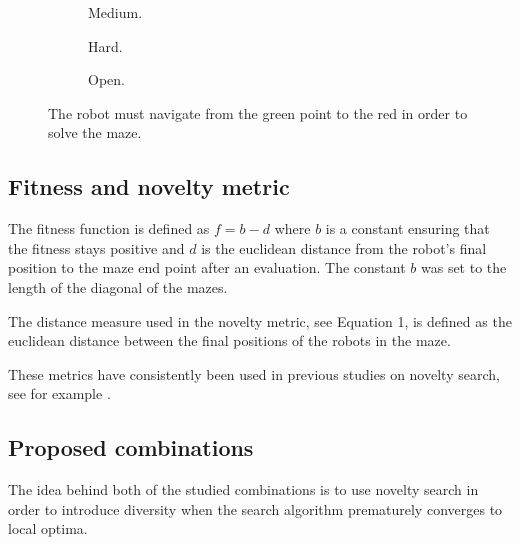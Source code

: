 \begin{figure}[H]
    \captionsetup[subfigure]{justification=centering}
    \centering
    \begin{mdframed}
        \begin{subfigure}[b]{0.3\textwidth}
            \centering
            \scalebox{0.25}{}
            \caption{Medium.}
        \end{subfigure}
        \begin{subfigure}[b]{0.3\textwidth}
            \centering
            \scalebox{0.25}{}
            \caption{Hard.}
        \end{subfigure}
        \begin{subfigure}[b]{0.3\textwidth}
            \centering
            \scalebox{0.25}{}
            \caption{Open.}
        \end{subfigure}
    \end{mdframed}
    \caption{The robot must navigate from the green point to the red in order to solve the maze.}
    \label{mazes}
\end{figure}


\subsection{Fitness and novelty metric}
\label{subsection:metrics}
The fitness function is defined as $f = b - d$ where $b$ is a constant ensuring that the fitness stays positive
and $d$ is the euclidean distance from the robot's final position to the maze end point after an evaluation.
The constant $b$ was set to the length of the diagonal of the mazes.

The distance measure used in the novelty metric, see Equation 1, is defined as the euclidean distance between the
final positions of the robots in the maze.

These metrics have consistently been used in previous studies on novelty search, see for example \cite{ns_study,novelty_alone}.

\subsection{Proposed combinations}
\label{subsection:linearisation}
The idea behind both of the studied combinations is to use novelty search in order to introduce diversity
when the search algorithm prematurely converges to local optima.

